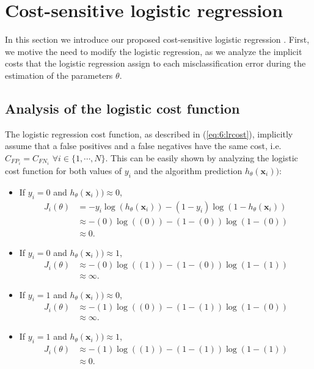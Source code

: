 \section{Cost-sensitive logistic regression}
\label{sec:6:cslr}

In this section we introduce our proposed cost-sensitive logistic regression 
\citep{CorreaBahnsen2014b}. First, we motive the need to modify the logistic regression, as we 
analyze the implicit costs that the logistic regression assign to each misclassification error 
during the estimation of the parameters $\theta$.

\subsection{Analysis of the logistic cost function}

The logistic regression cost function, as described in (\ref{eq:6:lrcost}), implicitly assume that 
a false positives and a false negatives have the same cost, i.e. $C_{{FP}_i} = C_{{FN}_i}$ $\forall 
i \in \{1,\cdots,N\}$. This can be easily shown by analyzing the logistic cost function for both 
values of $y_i$ and the algorithm prediction $h_\theta(\mathbf{x}_i))$:

\begin{itemize}
\item If $y_i=0$ and $h_\theta(\mathbf{x}_i)) \approx 0$, 
\begin{align*}
 J_i(\theta) &= -y_i\log(h_\theta(\mathbf{x}_i)) -(1-y_i)\log(1-h_\theta(\mathbf{x}_i)) \nonumber \\
 &\approx -(0)\log((0)) -(1-(0))\log(1-(0)) \nonumber \\
 &\approx 0.
\end{align*}

\item If $y_i=0$ and $h_\theta(\mathbf{x}_i)) \approx 1$, 
\begin{align*}
 J_i(\theta) &\approx -(0)\log((1)) -(1-(0))\log(1-(1)) \nonumber \\
 &\approx \infty.
\end{align*}

\item If $y_i=1$ and $h_\theta(\mathbf{x}_i)) \approx 0$, 
\begin{align*}
 J_i(\theta) &\approx -(1)\log((0)) -(1-(1))\log(1-(0)) \nonumber \\
 &\approx \infty.
\end{align*}

\item If $y_i=1$ and $h_\theta(\mathbf{x}_i)) \approx 1$, 
\begin{align*}
 J_i(\theta) &\approx -(1)\log((1)) -(1-(1))\log(1-(1)) \nonumber \\
 &\approx 0.
\end{align*}
\end{itemize}

